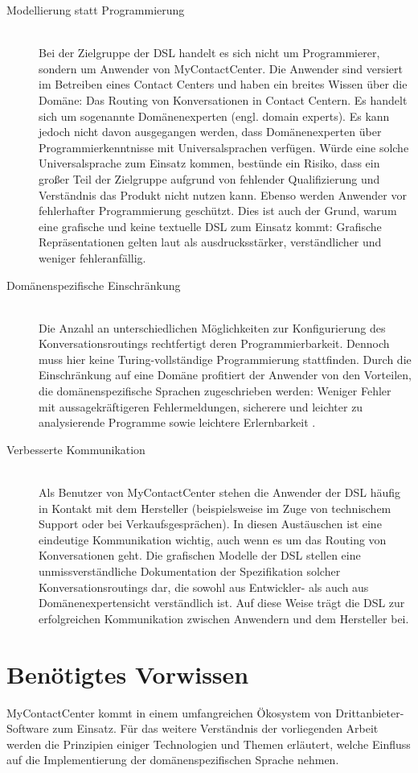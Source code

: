 \begin{description}
\item[Modellierung statt Programmierung] \hfill \\
Bei der Zielgruppe der DSL handelt es sich nicht um Programmierer, sondern um Anwender von MyContactCenter. Die Anwender sind versiert im Betreiben eines Contact Centers und haben ein breites Wissen über die Domäne: Das Routing von Konversationen in Contact Centern. Es handelt sich um sogenannte Domänenexperten (engl. domain experts). Es kann jedoch nicht davon ausgegangen werden, dass Domänenexperten über Programmierkenntnisse mit Universalsprachen verfügen. Würde eine solche Universalsprache zum Einsatz kommen, bestünde ein Risiko, dass ein großer Teil der Zielgruppe aufgrund von fehlender Qualifizierung und Verständnis das Produkt nicht nutzen kann. Ebenso werden Anwender vor fehlerhafter Programmierung geschützt. Dies ist auch der Grund, warum eine grafische und keine textuelle DSL zum Einsatz kommt: Grafische Repräsentationen gelten laut \cite[S. 50f]{Kelly:08} als ausdrucksstärker, verständlicher und weniger fehleranfällig.
\item[Domänenspezifische Einschränkung] \hfill \\
Die Anzahl an unterschiedlichen Möglichkeiten zur Konfigurierung des Konversationsroutings rechtfertigt deren Programmierbarkeit. Dennoch muss hier keine Turing-vollständige Programmierung stattfinden. Durch die Einschränkung auf eine Domäne profitiert der Anwender von den Vorteilen, die domänenspezifische Sprachen zugeschrieben werden: Weniger Fehler mit aussagekräftigeren Fehlermeldungen, sicherere und leichter zu analysierende Programme sowie leichtere Erlernbarkeit \cite{Tomassetti:17}.
\item[Verbesserte Kommunikation] \hfill \\
Als Benutzer von MyContactCenter stehen die Anwender der DSL häufig in Kontakt mit dem Hersteller (beispielsweise im Zuge von technischem Support oder bei Verkaufsgesprächen). In diesen Austäuschen ist eine eindeutige Kommunikation wichtig, auch wenn es um das Routing von Konversationen geht. Die grafischen Modelle der DSL stellen eine unmissverständliche Dokumentation der Spezifikation solcher Konversationsroutings dar, die sowohl aus Entwickler- als auch aus Domänenexpertensicht verständlich ist. Auf diese Weise trägt die DSL zur erfolgreichen Kommunikation zwischen Anwendern und dem Hersteller bei.
\end{description}


\section{Benötigtes Vorwissen}
MyContactCenter kommt in einem umfangreichen Ökosystem von Drittanbieter-Software zum Einsatz. Für das weitere Verständnis der vorliegenden Arbeit werden die Prinzipien einiger Technologien und Themen erläutert, welche Einfluss auf die Implementierung der domänenspezifischen Sprache nehmen. 

